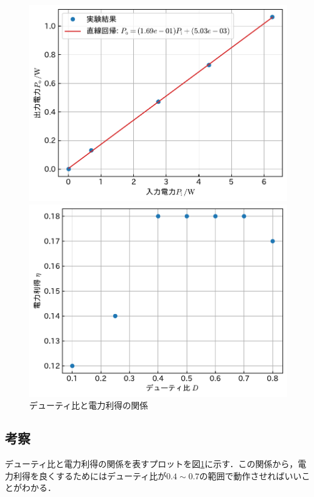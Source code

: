 \documentclass[1_power_supply.tex]{subfiles}
\begin{document}
\begin{figure}[htbp]
		\vspace{1.5mm}
		\begin{minipage}{0.45\columnwidth}
			\centering
			\includegraphics[width=0.8\columnwidth]{2_80p.pdf}
			\caption{$D=0.8$}\label{fig:2_80p}
		\end{minipage}
		\begin{minipage}{0.45\columnwidth}
			\centering
			\includegraphics[width=0.8\columnwidth]{2_d_eta.pdf}
			\caption{デューティ比と電力利得の関係}\label{fig:2_d_eta}
		\end{minipage}
	\end{figure}

	\subsection{考察}

	デューティ比と電力利得の関係を表すプロットを図\ref{fig:2_d_eta}に示す．この関係から，電力利得を良くするためにはデューティ比が$0.4\sim 0.7$の範囲で動作させればいいことがわかる．
\end{document}
